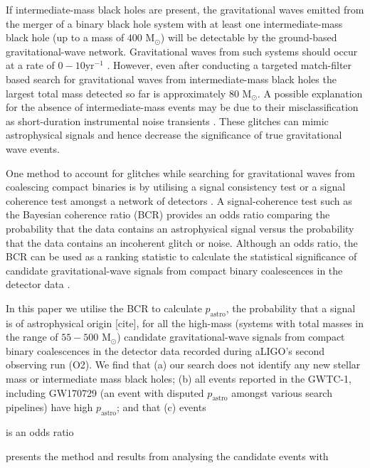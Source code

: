 \documentclass[%
 reprint,
 amsmath,amssymb,
 aps,
]{revtex4}
\newcommand{\msun}{{M${}_\odot$}\xspace}
\begin{document}
If intermediate-mass black holes are present, the gravitational waves emitted from the merger of a binary black hole system with at least one intermediate-mass black hole (up to a mass of $400$ \msun) will be detectable by the ground-based gravitational-wave network. Gravitational waves from such systems should occur at a rate of $0-10\text {yr}^{-1}$ \cite{fregeau2006imbhbRatePrediction, mandel2008rates,rodriguez2015bbhRatePredictions}.  However, even after conducting a targeted match-filter based search for gravitational waves from intermediate-mass black holes the largest total mass detected so far is approximately $80$ \msun \cite{salemi2019search, abbott2019gwtc}. A possible explanation for the absence of intermediate-mass events may be due to their misclassification as short-duration instrumental noise transients \cite{blip_glitches}. These glitches can mimic astrophysical signals and hence decrease the significance of true gravitational wave events. 

One method to account for glitches while searching for gravitational waves from coalescing compact binaries is by utilising a signal consistency test \cite{pycbc_short_duration_transients} or a signal coherence test amongst a network of detectors \cite{bci, bcr_paper,  bcr_gw151216, bayesian_odds}. A signal-coherence test such as the Bayesian coherence ratio (BCR) \cite{bcr_paper} provides an odds ratio comparing the probability that the data contains an astrophysical signal versus the probability that the data contains an incoherent glitch or noise. Although an odds ratio, the BCR can be used  as a ranking statistic to calculate the statistical significance of candidate gravitational-wave signals from compact binary coalescences in the detector data \cite{bcr_paper}.

In this paper we utilise the BCR to calculate $p_\text{astro}$, the probability that a signal is of astrophysical origin [cite],  for all the high-mass (systems with total masses in the range of $55-500$ \msun) candidate gravitational-wave signals from compact binary coalescences in the detector data recorded during aLIGO's second observing run (O2).  We find that (a) our search does not identify any new stellar mass or intermediate mass black holes; (b) all events reported in the GWTC-1, including GW170729 (an event with disputed $p_\text{astro}$ amongst various search pipelines) have high $p_\text{astro}$; and that (c) events 

is an odds ratio 

presents the method and results from analysing the candidate events with 
\end{document}
